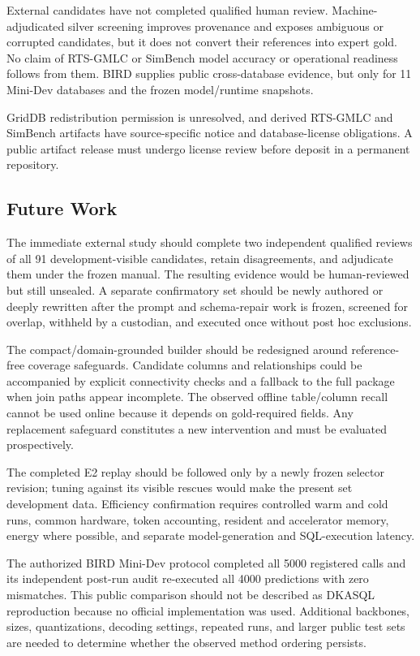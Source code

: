 \documentclass[applsci,article,submit,moreauthors]{Definitions/mdpi}
\begin{document}
External candidates have not completed qualified human review. Machine-adjudicated silver screening improves provenance and exposes ambiguous or corrupted candidates, but it does not convert their references into expert gold. No claim of RTS-GMLC or SimBench model accuracy or operational readiness follows from them. BIRD supplies public cross-database evidence, but only for 11 Mini-Dev databases and the frozen model/runtime snapshots.

GridDB redistribution permission is unresolved, and derived RTS-GMLC and SimBench artifacts have source-specific notice and database-license obligations. A public artifact release must undergo license review before deposit in a permanent repository.

\subsection{Future Work}
The immediate external study should complete two independent qualified reviews of all 91 development-visible candidates, retain disagreements, and adjudicate them under the frozen manual. The resulting evidence would be human-reviewed but still unsealed. A separate confirmatory set should be newly authored or deeply rewritten after the prompt and schema-repair work is frozen, screened for overlap, withheld by a custodian, and executed once without post hoc exclusions.

The compact/domain-grounded builder should be redesigned around reference-free coverage safeguards. Candidate columns and relationships could be accompanied by explicit connectivity checks and a fallback to the full package when join paths appear incomplete. The observed offline table/column recall cannot be used online because it depends on gold-required fields. Any replacement safeguard constitutes a new intervention and must be evaluated prospectively.

The completed E2 replay should be followed only by a newly frozen selector revision; tuning against its visible rescues would make the present set development data. Efficiency confirmation requires controlled warm and cold runs, common hardware, token accounting, resident and accelerator memory, energy where possible, and separate model-generation and SQL-execution latency.

The authorized BIRD Mini-Dev protocol completed all 5000 registered calls and its independent post-run audit re-executed all 4000 predictions with zero mismatches. This public comparison should not be described as DKASQL reproduction because no official implementation was used. Additional backbones, sizes, quantizations, decoding settings, repeated runs, and larger public test sets are needed to determine whether the observed method ordering persists.
\end{document}
